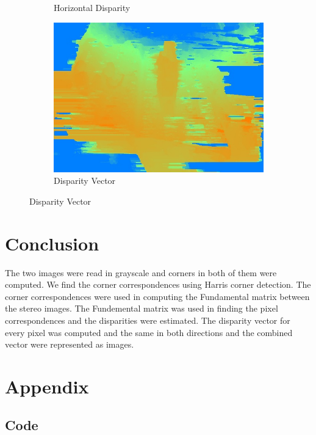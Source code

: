 \documentclass[letterpaper,11pt]{article}
\begin{document}
\begin{figure}[h]
\begin{subfigure}{.3\textwidth}
  \caption{Horizontal Disparity}
  \label{fig:sfig1}
\end{subfigure}%
\begin{subfigure}{.3\textwidth}
  \centering
  \includegraphics[width=.9\linewidth]{images/magnitude1.jpg}
  \caption{Disparity Vector}
  \label{fig:sfig2}
\end{subfigure}
\end{figure}


\section{Conclusion}
The two images were read in grayscale and corners in both of them were computed. We find the corner
correspondences using Harris corner detection. The corner correspondences were used in computing the
Fundamental matrix between the stereo images. The Fundemental matrix was used in finding the
pixel correspondences and the disparities were estimated. The disparity vector for every pixel was computed
and the same in both directions and the combined vector were represented as images.

\section{Appendix}

\subsection{Code}
\end{document}
